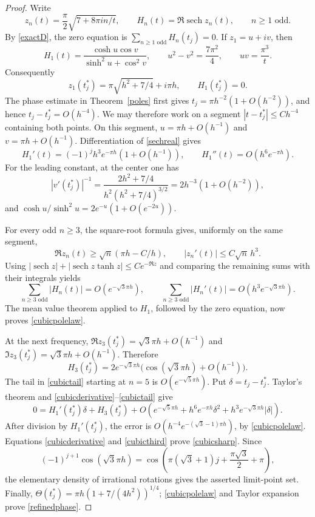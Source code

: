 \documentclass[11pt]{amsart}
\theoremstyle{definition}
\theoremstyle{remark}
\numberwithin{equation}{section}
\newcommand{\sech}{\operatorname{sech}}
\begin{document}
\begin{proof}
Write
\[
 z_n(t)=\frac\pi2\sqrt{7+8\pi in/t},\qquad
 H_n(t)=\Re\sech z_n(t),\qquad n\ge1\text{ odd}.
\]
By \eqref{exactD}, the zero equation is $\sum_{n\ge1\text{ odd}}H_n(t_j)=0$.
If $z_1=u+iv$, then
\begin{equation}\label{sechreal}
 H_1(t)=\frac{\cosh u\cos v}{\sinh^2u+\cos^2v},\qquad
 u^2-v^2=\frac{7\pi^2}{4},\qquad uv=\frac{\pi^3}{t}.
\end{equation}
Consequently
\[
 z_1(t_j^*)=\pi\sqrt{h^2+7/4}+i\pi h,\qquad H_1(t_j^*)=0.
\]
The phase estimate in Theorem~\ref{poles} first gives
$t_j=\pi h^{-2}(1+O(h^{-2}))$, and hence $t_j-t_j^*=O(h^{-4})$.
We may therefore work on a segment $|t-t_j^*|\le Ch^{-4}$ containing
both points. On this segment,
$u=\pi h+O(h^{-1})$ and $v=\pi h+O(h^{-1})$.
Differentiation of \eqref{sechreal} gives
\begin{equation}\label{cubicderivative}
 H_1'(t)=(-1)^j h^3e^{-\pi h}(1+O(h^{-1})),\qquad
 H_1''(t)=O(h^6e^{-\pi h}).
\end{equation}
For the leading constant, at the center one has
\[
 |v'(t_j^*)|^{-1}
 =\frac{2h^2+7/4}{h^2(h^2+7/4)^{3/2}}
 =2h^{-3}(1+O(h^{-2})),
\]
and $\cosh u/\sinh^2u=2e^{-u}(1+O(e^{-2u}))$.

For every odd $n\ge3$, the square-root formula gives, uniformly on the
same segment,
\[
 \Re z_n(t)\ge\sqrt n(\pi h-C/h),\qquad
 |z_n'(t)|\le C\sqrt n\,h^3.
\]
Using $|\sech z|+|\sech z\tanh z|\le Ce^{-\Re z}$ and comparing the
remaining sums with their integrals yields
\begin{equation}\label{cubictail}
 \sum_{n\ge3\text{ odd}}|H_n(t)|=O(e^{-\sqrt3\pi h}),\qquad
 \sum_{n\ge3\text{ odd}}|H_n'(t)|=O(h^3e^{-\sqrt3\pi h}).
\end{equation}
The mean value theorem applied to $H_1$, followed by the zero equation,
now proves \eqref{cubicpolelaw}.

At the next frequency,
$\Re z_3(t_j^*)=\sqrt3\pi h+O(h^{-1})$ and
$\Im z_3(t_j^*)=\sqrt3\pi h+O(h^{-1})$. Therefore
\begin{equation}\label{cubicthird}
 H_3(t_j^*)=2e^{-\sqrt3\pi h}
             \bigl(\cos(\sqrt3\pi h)+O(h^{-1})\bigr).
\end{equation}
The tail in \eqref{cubictail} starting at $n=5$ is
$O(e^{-\sqrt5\pi h})$. Put $\delta=t_j-t_j^*$.
Taylor's theorem and \eqref{cubicderivative}--\eqref{cubictail} give
\[
 0=H_1'(t_j^*)\delta+H_3(t_j^*)+
 O\!\left(e^{-\sqrt5\pi h}
       +h^6e^{-\pi h}\delta^2
       +h^3e^{-\sqrt3\pi h}|\delta|\right).
\]
After division by $H_1'(t_j^*)$, the error is
$O(h^{-4}e^{-(\sqrt3-1)\pi h})$, by \eqref{cubicpolelaw}.
Equations \eqref{cubicderivative} and \eqref{cubicthird} prove
\eqref{cubicsharp}. Since
\[
 (-1)^{j+1}\cos(\sqrt3\pi h)
 =\cos\!\left(\pi(\sqrt3+1)j+\frac{\pi\sqrt3}{2}+\pi\right),
\]
the elementary density of irrational rotations gives the asserted
limit-point set. Finally,
$\Theta(t_j^*)=\pi h(1+7/(4h^2))^{1/4}$;
\eqref{cubicpolelaw} and Taylor expansion prove \eqref{refinedphase}.
\end{proof}
\end{document}

